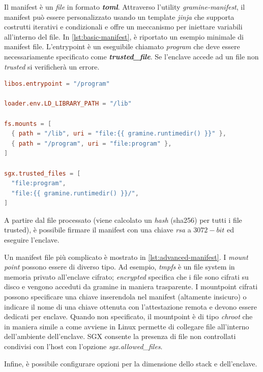 \documentclass{article}
\begin{document}
Il manifest è un \textit{file} in formato \textbf{\textit{toml}}. Attraverso l'utility \textit{gramine-manifest}, il manifest può essere personalizzato usando un template \textit{jinja} che supporta costrutti iterativi e condizionali e offre un meccanismo per iniettare variabili all'interno del file. In \cref{lst:basic-manifest}, è riportato un esempio minimale di manifest file. L'entrypoint è un eseguibile chiamato \textit{program} che deve essere necessariamente specificato come \textbf{\textit{trusted\_file}}. Se l'enclave accede ad un file non \textit{trusted} si verificherà un errore.

\begin{lstlisting}[caption=Esempio minimale di manifest file,label=lst:basic-manifest, language=Toml]
libos.entrypoint = "/program"

loader.env.LD_LIBRARY_PATH = "/lib"

fs.mounts = [
  { path = "/lib", uri = "file:{{ gramine.runtimedir() }}" },
  { path = "/program", uri = "file:program" },
]

sgx.trusted_files = [
  "file:program",
  "file:{{ gramine.runtimedir() }}/",
]
\end{lstlisting}
A partire dal file processato (viene calcolato un \textit{hash} (sha256) per tutti i file trusted), è possibile firmare il manifest con una chiave \textit{rsa} a $3072-bit$ ed eseguire l'enclave. 

Un manifest file più complicato è mostrato in \cref{lst:advanced-manifest}. I \textit{mount point} possono essere di diverso tipo. Ad esempio, \textit{tmpfs} è un file system in memoria privato all'enclave cifrato; \textit{encrypted} specifica che i file sono cifrati su disco e vengono acceduti da gramine in maniera trasparente. I mountpoint cifrati  possono specificare una chiave inserendola nel manifest (altamente insicuro) o indicare il nome di una chiave ottenuta con l'attestazione remota e devono essere dedicati per enclave. Quando non specificato, il mountpoint è di tipo \textit{chroot} che in maniera simile a come avviene in Linux permette di collegare file all'interno dell'ambiente dell'enclave. SGX consente la presenza di file non controllati condivisi con l'host con l'opzione \textit{sgx.allowed\_files}.

Infine, è possibile configurare opzioni per la dimensione dello stack e dell'enclave.
\end{document}
